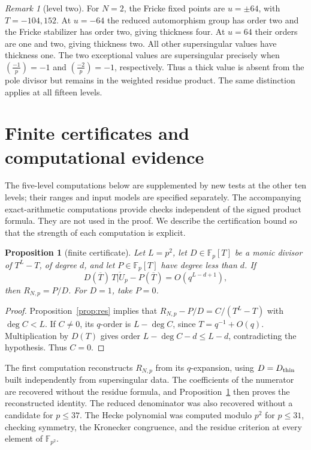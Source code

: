 \documentclass[11pt,a4paper]{article}
\numberwithin{equation}{section}
\newtheorem{proposition}[theorem]{Proposition}
\theoremstyle{definition}
\theoremstyle{remark}
\newtheorem{remark}[theorem]{Remark}
\newcommand{\Fp}{\mathbb F_p}
\newcommand{\Fq}{\mathbb F_{p^2}}
\begin{document}
\begin{remark}[level two]
For $N=2$, the Fricke fixed points are $u=\pm64$, with $T=-104,152$.
At $u=-64$ the reduced automorphism group has order two and the Fricke stabilizer
has order two, giving thickness four. At $u=64$ their orders are one and two,
giving thickness two. All other supersingular values have thickness one.
The two exceptional values are supersingular precisely when
$\left(\frac{-1}{p}\right)=-1$ and $\left(\frac{-2}{p}\right)=-1$, respectively.
Thus a thick value is absent from the pole divisor but remains in the
weighted residue product. The same distinction applies at all fifteen levels.
\end{remark}

\section{Finite certificates and computational evidence}\label{sec:comp}
The five-level computations below are supplemented by new tests at the
other ten levels; their ranges and input models are specified separately.
The accompanying exact-arithmetic computations provide checks independent of the
signed product formula. They are not used in the proof. We describe the certification
bound so that the strength of each computation is explicit.

\begin{proposition}[finite certificate]\label{prop:certificate}
Let $L=p^2$, let $D\in\Fp[T]$ be a monic divisor of $T^L-T$, of degree $d$, and
let $P\in\Fp[T]$ have degree less than $d$. If
\[
D(\overline T)\,\overline{T|U_p}-P(\overline T)=O(q^{L-d+1}),
\]
then $R_{N,p}=P/D$. For $D=1$, take $P=0$.
\end{proposition}
\begin{proof}
Proposition~\ref{prop:res} implies that
$R_{N,p}-P/D=C/(T^L-T)$ with $\deg C<L$.
If $C\ne0$, its $q$-order is $L-\deg C$, since $T=q^{-1}+O(q)$.
Multiplication by $D(T)$ gives order $L-\deg C-d\le L-d$, contradicting the
hypothesis. Thus $C=0$.
\end{proof}

The first computation reconstructs $R_{N,p}$ from its $q$-expansion, using
$D=D_{\rm thin}$ built independently from supersingular data.
The coefficients of the numerator are recovered without the residue formula,
and Proposition~\ref{prop:certificate} then proves the reconstructed identity.
The reduced denominator was also recovered without a candidate for $p\le37$.
The Hecke polynomial was computed modulo $p^2$ for $p\le31$, checking symmetry,
the Kronecker congruence, and the residue criterion at every element of $\Fq$.
\end{document}

